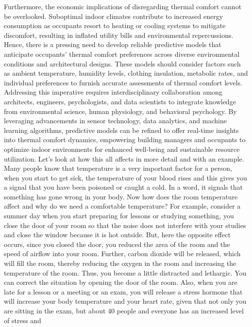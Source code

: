 Furthermore, the economic implications of disregarding thermal comfort
cannot be overlooked. Suboptimal indoor climates contribute to increased
energy consumption as occupants resort to heating or cooling systems to
mitigate discomfort, resulting in inflated utility bills and
environmental repercussions. Hence, there is a pressing need to develop
reliable predictive models that anticipate occupants' thermal comfort
preferences across diverse environmental conditions and architectural
designs. These models should consider factors such as ambient
temperature, humidity levels, clothing insulation, metabolic rates, and
individual preferences to furnish accurate assessments of thermal
comfort levels. Addressing this imperative requires interdisciplinary
collaboration among architects, engineers, psychologists, and data
scientists to integrate knowledge from environmental science, human
physiology, and behavioral psychology. By leveraging advancements in
sensor technology, data analytics, and machine learning algorithms,
predictive models can be refined to offer real-time insights into
thermal comfort dynamics, empowering building managers and occupants to
optimize indoor environments for enhanced well-being and sustainable
resource utilization. Let's look at how this all affects in more detail
and with an example. Many people know that temperature is a very
important factor for a person, when you start to get sick, the
temperature of your blood rises and this gives you a signal that you
have been poisoned or caught a cold. In a word, it signals that
something has gone wrong in your body. Now how does the room temperature
affect and why do we need a comfortable temperature? For example,
consider a summer day when you start preparing for lessons or studying
something, you close the door of your room so that the noise does not
interfere with your studies and close the window because it is hot
outside. But, here the opposite effect occurs, since you closed the
door, you reduced the area of the room and the speed of airflow into
your room. Further, carbon dioxide will be released, which will fill the
room, thereby reducing the oxygen in the room and increasing the
temperature of the room. Thus, you become a little distracted and
lethargic. You can correct the situation by opening the door of the
room. Also, when you are late for a lesson or a meeting or an exam, you
will release a stress hormone that will increase your body temperature
and your heart rate, given that not only you are sitting in the exam,
but about 40 people and everyone has an increased level of stress and
